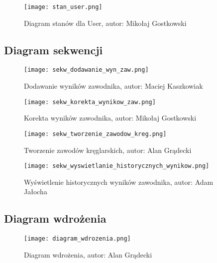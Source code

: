 \documentclass[polish, a4paper]{article}
\begin{document}
\begin{figure}[H]
  \centering
  \texttt{[image: stan\_user.png]}
  \caption{Diagram stanów dla User, autor: Mikołaj Gostkowski}
\end{figure}

\subsection{Diagram sekwencji}

\begin{figure}[H]
  \centering
  \texttt{[image: sekw\_dodawanie\_wyn\_zaw.png]}
  \caption{Dodawanie wyników zawodnika, autor: Maciej Kaszkowiak}
\end{figure}

\begin{figure}[H]
  \centering
  \texttt{[image: sekw\_korekta\_wynikow\_zaw.png]}
  \caption{Korekta wyników zawodnika, autor: Mikołaj Gostkowski}
\end{figure}

\begin{figure}[H]
  \centering
  \texttt{[image: sekw\_tworzenie\_zawodow\_kreg.png]}
  \caption{Tworzenie zawodów kręglarskich, autor: Alan Grądecki}
\end{figure}

\begin{figure}[H]
  \centering
  \texttt{[image: sekw\_wyswietlanie\_historycznych\_wynikow.png]}
  \caption{Wyświetlenie historycznych wyników zawodnika, autor: Adam Jałocha}
\end{figure}

\subsection{Diagram wdrożenia}
\begin{figure}[H]
  \centering
  \texttt{[image: diagram\_wdrozenia.png]}
    \caption{Diagram wdrożenia, autor: Alan Grądecki}
\end{figure}
\end{document}

